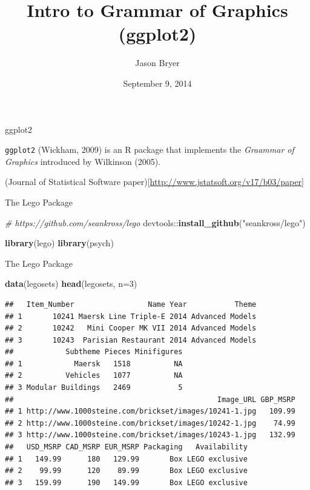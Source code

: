 \documentclass[ignorenonframetext,]{beamer}
\title{Intro to Grammar of Graphics (ggplot2)}
\author{Jason Bryer}
\date{September 9, 2014}
\newenvironment{Shaded}{\begin{snugshade}}{\end{snugshade}}
\newcommand{\KeywordTok}[1]{\textcolor[rgb]{0.13,0.29,0.53}{\textbf{{#1}}}}
\newcommand{\DataTypeTok}[1]{\textcolor[rgb]{0.13,0.29,0.53}{{#1}}}
\newcommand{\DecValTok}[1]{\textcolor[rgb]{0.00,0.00,0.81}{{#1}}}
\newcommand{\StringTok}[1]{\textcolor[rgb]{0.31,0.60,0.02}{{#1}}}
\newcommand{\CommentTok}[1]{\textcolor[rgb]{0.56,0.35,0.01}{\textit{{#1}}}}
\newcommand{\NormalTok}[1]{{#1}}
\begin{document}
\frame{\titlepage}

\begin{frame}{ggplot2}

\texttt{ggplot2} (Wickham, 2009) is an R package that implements the
\emph{Graammar of Graphics} introduced by Wilkinson (2005).

(Journal of Statistical Software
paper){[}\url{http://www.jstatsoft.org/v17/b03/paper}{]}

\end{frame}

\begin{frame}[fragile]{The Lego Package}

\begin{Shaded}
\begin{Highlighting}[]
\CommentTok{# https://github.com/seankross/lego}
\NormalTok{devtools::}\KeywordTok{install_github}\NormalTok{(}\StringTok{"seankross/lego"}\NormalTok{)}
\end{Highlighting}
\end{Shaded}

\begin{Shaded}
\begin{Highlighting}[]
\KeywordTok{library}\NormalTok{(lego)}
\KeywordTok{library}\NormalTok{(psych)}
\end{Highlighting}
\end{Shaded}

\end{frame}

\begin{frame}[fragile]{The Lego Package}

\begin{Shaded}
\begin{Highlighting}[]
\KeywordTok{data}\NormalTok{(legosets)}
\KeywordTok{head}\NormalTok{(legosets, }\DataTypeTok{n=}\DecValTok{3}\NormalTok{)}
\end{Highlighting}
\end{Shaded}

\begin{verbatim}
##   Item_Number                 Name Year           Theme
## 1       10241 Maersk Line Triple-E 2014 Advanced Models
## 2       10242   Mini Cooper MK VII 2014 Advanced Models
## 3       10243  Parisian Restaurant 2014 Advanced Models
##            Subtheme Pieces Minifigures
## 1            Maersk   1518          NA
## 2          Vehicles   1077          NA
## 3 Modular Buildings   2469           5
##                                               Image_URL GBP_MSRP
## 1 http://www.1000steine.com/brickset/images/10241-1.jpg   109.99
## 2 http://www.1000steine.com/brickset/images/10242-1.jpg    74.99
## 3 http://www.1000steine.com/brickset/images/10243-1.jpg   132.99
##   USD_MSRP CAD_MSRP EUR_MSRP Packaging   Availability
## 1   149.99      180   129.99       Box LEGO exclusive
## 2    99.99      120    89.99       Box LEGO exclusive
## 3   159.99      190   149.99       Box LEGO exclusive
\end{verbatim}

\end{frame}
\end{document}
